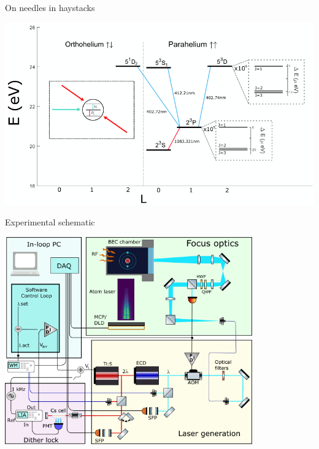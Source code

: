 \documentclass{beamer}
\begin{document}

\begin{frame}{On needles in haystacks}
    \begin{center}
        \includegraphics[width=\textwidth]{figures/Spectra/spectroscopy_targets.png}    
    \end{center}
\end{frame}

\begin{frame}{Experimental schematic}
    \begin{center}
        \includegraphics[width=0.8\textwidth]{figures/expt_schematic_simplified.png}    
    \end{center}
\end{frame}
\end{document}
